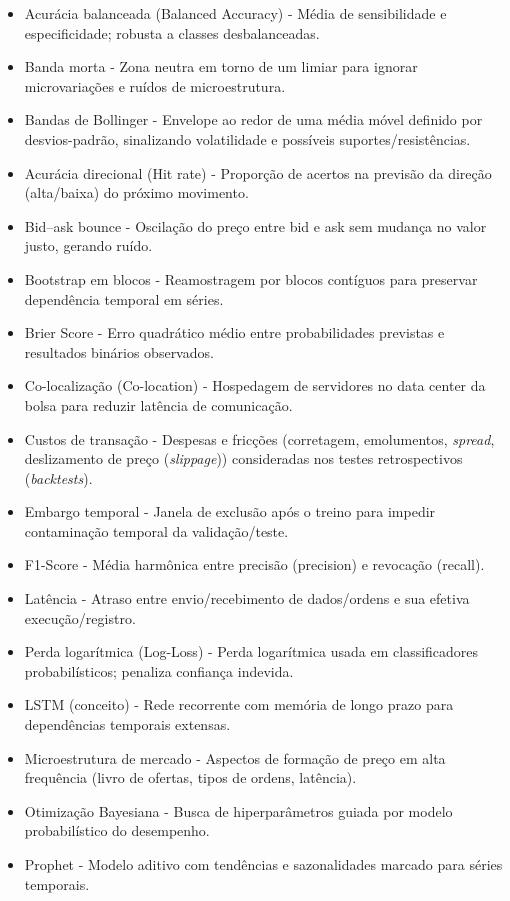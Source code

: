 \begin{itemize}
\item {Acurácia balanceada (Balanced Accuracy)} - Média de sensibilidade e especificidade; robusta a classes desbalanceadas.
\item {Banda morta} - Zona neutra em torno de um limiar para ignorar microvariações e ruídos de microestrutura.
\item {Bandas de Bollinger} - Envelope ao redor de uma média móvel definido por desvios-padrão, sinalizando volatilidade e possíveis suportes/resistências.
\item {Acurácia direcional (Hit rate)} - Proporção de acertos na previsão da direção (alta/baixa) do próximo movimento.
\item {Bid–ask bounce} - Oscilação do preço entre bid e ask sem mudança no valor justo, gerando ruído.
\item {Bootstrap em blocos} - Reamostragem por blocos contíguos para preservar dependência temporal em séries.
\item {Brier Score} - Erro quadrático médio entre probabilidades previstas e resultados binários observados.
\item {Co-localização (Co-location)} - Hospedagem de servidores no data center da bolsa para reduzir latência de comunicação.
\item {Custos de transação} - Despesas e fricções (corretagem, emolumentos, \textit{spread}, deslizamento de preço (\textit{slippage})) consideradas nos testes retrospectivos (\textit{backtests}).
\item {Embargo temporal} - Janela de exclusão após o treino para impedir contaminação temporal da validação/teste.
\item {F1-Score} - Média harmônica entre precisão (precision) e revocação (recall).
\item {Latência} - Atraso entre envio/recebimento de dados/ordens e sua efetiva execução/registro.
\item {Perda logarítmica (Log-Loss)} - Perda logarítmica usada em classificadores probabilísticos; penaliza confiança indevida.
\item {LSTM (conceito)} - Rede recorrente com memória de longo prazo para dependências temporais extensas.
\item {Microestrutura de mercado} - Aspectos de formação de preço em alta frequência (livro de ofertas, tipos de ordens, latência).
\item {Otimização Bayesiana} - Busca de hiperparâmetros guiada por modelo probabilístico do desempenho.
\item {Prophet} - Modelo aditivo com tendências e sazonalidades marcado para séries temporais.

\end{itemize}

